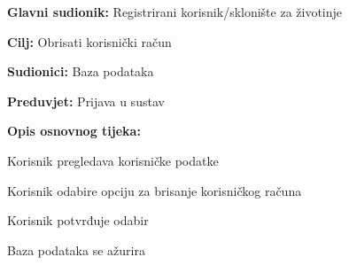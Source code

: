 					\noindent {}
					\begin{packed_item}
	
						\item \textbf{Glavni sudionik:} Registrirani korisnik/sklonište za životinje
						\item  \textbf{Cilj:} Obrisati korisnički račun
						\item  \textbf{Sudionici:} Baza podataka
						\item  \textbf{Preduvjet:} Prijava u sustav
						\item  \textbf{Opis osnovnog tijeka:}
						
						\item[] \begin{packed_enum}
	
							\item Korisnik pregledava korisničke podatke
							\item Korisnik odabire opciju za brisanje korisničkog računa
							\item Korisnik potvrđuje odabir
							\item Baza podataka se ažurira
						\end{packed_enum}
					\end{packed_item}
					
